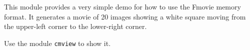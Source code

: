 This module provides a very simple demo for how to use the Fmovie memory
format.
It generates a movie of 20 images showing a white square moving from the
upper-left corner to the lower-right corner.

Use the module \verb+cmview+ to show it.

